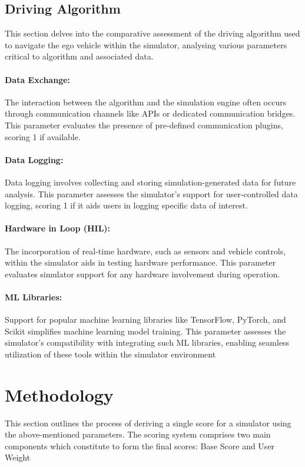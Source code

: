 \documentclass[12pt,twoside,a4paper,parskip]{scrbook} %
\begin{document}
\subsection{Driving Algorithm}
This section delves into the comparative assessment of the driving algorithm used to navigate the ego vehicle within the simulator, analysing various parameters critical to algorithm and associated data.

\paragraph*{Data Exchange:} 
The interaction between the algorithm and the simulation engine often occurs through communication channels like APIs or dedicated communication bridges. This parameter evaluates the presence of pre-defined communication plugins, scoring 1 if available.

\paragraph*{Data Logging:}
Data logging involves collecting and storing simulation-generated data for future analysis. This parameter assesses the simulator's support for user-controlled data logging, scoring 1 if it aids users in logging specific data of interest.

\paragraph*{Hardware in Loop (HIL):}
The incorporation of real-time hardware, such as sensors and vehicle controls, within the simulator aids in testing hardware performance. This parameter evaluates simulator support for any hardware involvement during operation.

\paragraph*{ML Libraries:}
Support for popular machine learning libraries like TensorFlow, PyTorch, and Scikit simplifies machine learning model training. This parameter assesses the simulator's compatibility with integrating such ML libraries, enabling seamless utilization of these tools within the simulator environment

\section{Methodology}
This section outlines the process of deriving a single score for a simulator using the above-mentioned parameters. The scoring system comprises two main components which constitute to form the final scores: Base Score and User Weight
\end{document}
